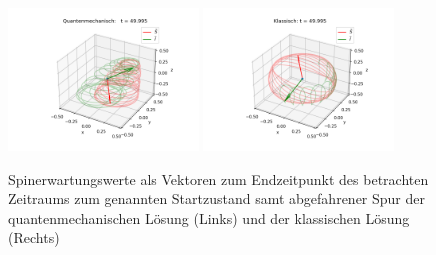 \begin{figure}[h!]
    \centering
    \includegraphics[width = 0.45\textwidth]{Abbildungen/Plot_Vektor_Quant.png}
    \includegraphics[width = 0.45\textwidth]{Abbildungen/Plot_Vektor_Klassisch.png}
    \caption{Spinerwartungswerte als Vektoren zum Endzeitpunkt des betrachten Zeitraums zum genannten Startzustand samt abgefahrener Spur der
    quantenmechanischen Lösung (Links) und der klassischen Lösung (Rechts)}
    \label{fig:Plots_3D}
\end{figure}


